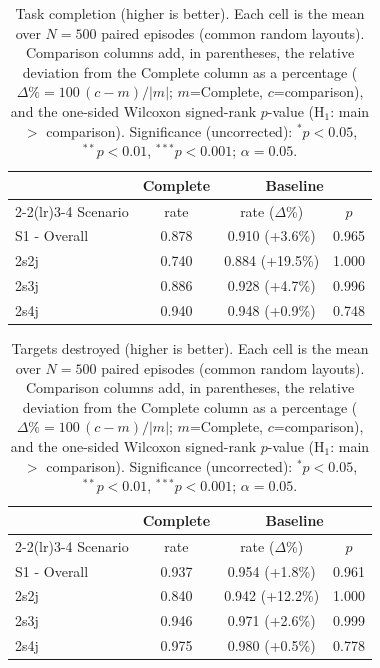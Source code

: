 
\begin{table}[ht]
  \centering
  \caption{Task completion (higher is better). Each cell is the mean over $N=500$ paired episodes (common random layouts). Comparison columns add, in parentheses, the relative deviation from the Complete column as a percentage ($\Delta\%=100\,(c-m)/|m|$; $m$=Complete, $c$=comparison), and the one-sided Wilcoxon signed-rank $p$-value (H$_1$: main $>$ comparison). Significance (uncorrected): $^{*}p<0.05$, $^{**}p<0.01$, $^{***}p<0.001$; $\alpha=0.05$.}
  \label{tab:wilcoxon-completion}
  \small
  \begin{tabular}{l c cc}
    \toprule
     & Complete & \multicolumn{2}{c}{Baseline} \\
    \cmidrule(lr){2-2}\cmidrule(lr){3-4}
    Scenario & {rate} & {rate ($\Delta$\%)} & {$p$} \\
    \midrule
    S1 - Overall & 0.878 & 0.910 (+3.6\%) & 0.965 \\
    2s2j & 0.740 & 0.884 (+19.5\%) & 1.000 \\
    2s3j & 0.886 & 0.928 (+4.7\%) & 0.996 \\
    2s4j & 0.940 & 0.948 (+0.9\%) & 0.748 \\
    \bottomrule
  \end{tabular}
\end{table}

\begin{table}[ht]
  \centering
  \caption{Targets destroyed (higher is better). Each cell is the mean over $N=500$ paired episodes (common random layouts). Comparison columns add, in parentheses, the relative deviation from the Complete column as a percentage ($\Delta\%=100\,(c-m)/|m|$; $m$=Complete, $c$=comparison), and the one-sided Wilcoxon signed-rank $p$-value (H$_1$: main $>$ comparison). Significance (uncorrected): $^{*}p<0.05$, $^{**}p<0.01$, $^{***}p<0.001$; $\alpha=0.05$.}
  \label{tab:wilcoxon-targets}
  \small
  \begin{tabular}{l c cc}
    \toprule
     & Complete & \multicolumn{2}{c}{Baseline} \\
    \cmidrule(lr){2-2}\cmidrule(lr){3-4}
    Scenario & {rate} & {rate ($\Delta$\%)} & {$p$} \\
    \midrule
    S1 - Overall & 0.937 & 0.954 (+1.8\%) & 0.961 \\
    2s2j & 0.840 & 0.942 (+12.2\%) & 1.000 \\
    2s3j & 0.946 & 0.971 (+2.6\%) & 0.999 \\
    2s4j & 0.975 & 0.980 (+0.5\%) & 0.778 \\
    \bottomrule
  \end{tabular}
\end{table}

